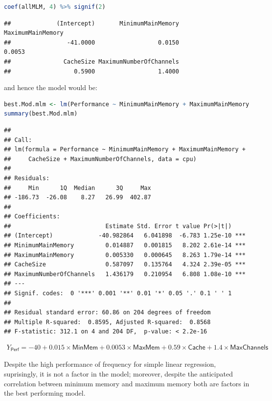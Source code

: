 \documentclass[
]{article}
\begin{document}
\begin{lstlisting}[language=R]
coef(allMLM, 4) %>% signif(2)
\end{lstlisting}

\begin{lstlisting}
##             (Intercept)       MinimumMainMemory       MaximumMainMemory 
##                -41.0000                  0.0150                  0.0053 
##               CacheSize MaximumNumberOfChannels 
##                  0.5900                  1.4000
\end{lstlisting}

and hence the model would be:

\begin{lstlisting}[language=R]
best.Mod.mlm <- lm(Performance ~ MinimumMainMemory + MaximumMainMemory + CacheSize + MaximumNumberOfChannels, cpu)
summary(best.Mod.mlm)
\end{lstlisting}

\begin{lstlisting}
## 
## Call:
## lm(formula = Performance ~ MinimumMainMemory + MaximumMainMemory + 
##     CacheSize + MaximumNumberOfChannels, data = cpu)
## 
## Residuals:
##     Min      1Q  Median      3Q     Max 
## -186.73  -26.08    8.27   26.99  402.87 
## 
## Coefficients:
##                           Estimate Std. Error t value Pr(>|t|)    
## (Intercept)             -40.982864   6.041898  -6.783 1.25e-10 ***
## MinimumMainMemory         0.014887   0.001815   8.202 2.61e-14 ***
## MaximumMainMemory         0.005330   0.000645   8.263 1.79e-14 ***
## CacheSize                 0.587097   0.135764   4.324 2.39e-05 ***
## MaximumNumberOfChannels   1.436179   0.210954   6.808 1.08e-10 ***
## ---
## Signif. codes:  0 '***' 0.001 '**' 0.01 '*' 0.05 '.' 0.1 ' ' 1
## 
## Residual standard error: 60.86 on 204 degrees of freedom
## Multiple R-squared:  0.8595, Adjusted R-squared:  0.8568 
## F-statistic: 312.1 on 4 and 204 DF,  p-value: < 2.2e-16
\end{lstlisting}

\begin{align}
Y_{\textsf{Perf}} = -40 + 0.015\times \textsf{MinMem}  + 0.0053 \times \textsf{MaxMem} + 0.59\times \textsf{Cache} + 1.4\times \textsf{MaxChannels} \label{MultMod}
\end{align}

Despite the high performance of frequency for simple linear regression,
suprisingly, it is not a factor in the model; moreover, despite the
anticipated correlation between minimum memory and maximum memory both are factors in the best performing model. 
\end{document}
